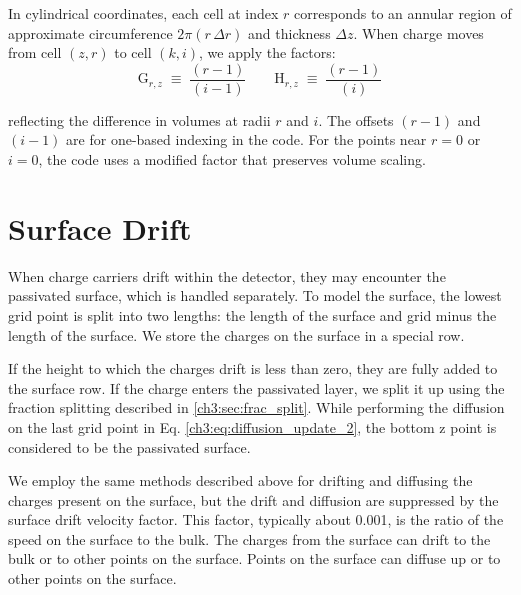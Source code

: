 In cylindrical coordinates, each cell at index $r$ corresponds to an annular region of approximate circumference $2\pi (r \,\Delta r)$ and thickness $\Delta z$. When charge moves from cell $(z,r)$ to cell $(k,i)$, we apply the factors:
\[
\text{G}_{r,z} \;\equiv\; \frac{(r-1)}{(i-1)}
\qquad
\text{H}_{r,z} \;\equiv\; \frac{(r-1)}{(i)}
\] 

reflecting the difference in volumes at radii $r$ and $i$.
The offsets $(r-1)$ and $(i-1)$ are for one-based indexing in the code. For the points near $r=0$ or $i=0$, the code uses a modified factor that preserves volume scaling. 


\section{Surface Drift}

When charge carriers drift within the detector, they may encounter the passivated surface, which is handled separately. To model the surface, the lowest grid point is split into two lengths: the length of the surface and grid minus the length of the surface. We store the charges on the surface in a special row. 

If the height to which the charges drift is less than zero, they are fully added to the surface row. If the charge enters the passivated layer, we split it up using the fraction splitting described in \ref{ch3:sec:frac_split}. While performing the diffusion on the last grid point in Eq. \ref{ch3:eq:diffusion_update_2}, the bottom z point is considered to be the passivated surface. 


We employ the same methods described above for drifting and diffusing the charges present on the surface, but the drift and diffusion are suppressed by the surface drift velocity factor. This factor, typically about 0.001, is the ratio of the speed on the surface to the bulk. The charges from the surface can drift to the bulk or to other points on the surface. Points on the surface can diffuse up or to other points on the surface.

